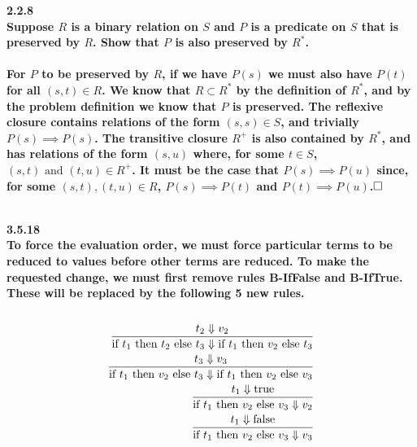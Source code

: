 \documentclass[12pt,letterpaper]{article}
\newcommand{\hwSect}[1] {\noindent\large\bf#1\rm\normalsize}
\newcommand{\done}{$\hfill\square$}
\begin{document}
\hwSect{2.2.8}\\
Suppose $R$ is a binary relation on $S$ and $P$ is a predicate on $S$ that is preserved by $R$. Show that $P$ is also preserved by $R^*$.\\ \\
For $P$ to be preserved by $R$, if we have $P(s)$ we must also have $P(t)$ for all $(s,t) \in R$.  We know that $R \subset R^*$ by the definition of $R^*$, and by the problem definition we know that $P$ is preserved.   The reflexive closure contains relations of the form $(s,s) \in S$, and trivially $P(s) \implies P(s)$. The transitive closure $R^+$ is also contained by $R^*$, and has relations of the form $(s,u)$ where, for some $t \in S$, $(s,t) \text{ and } (t,u) \in R^+$. It must be the case that $P(s) \implies P(u)$ since, for some $(s,t),(t,u) \in R$, $P(s) \implies P(t)$ and $P(t) \implies P(u)$.\done\\ \\

\begin{comment}
There are 3 types of elements in our new set: R, R ref, and R trans.  If the pair is from R then it obsviously still preserves P.  If the element is from R ref then the preservation of P is trivial because If s R t such that P(s) and P(t).

For R trans, we can look at all left terms in the relation as set S and all right terms in the relation as set T.  By applying R trans iterally we are adding new mappings from S to T.  However, we are not adding new elements to S or T; we have already evaluated the predicates of both sets in R and confirmed that R preserved P.  
\end{comment}

\hwSect{3.5.18}\\
To force the evaluation order, we must force particular terms to be reduced to values before other terms are reduced. To make the requested change, we must first remove rules B-IfFalse and B-IfTrue. These will be replaced by the following 5 new rules.\\ \\

\begin{eqnarray}
{t_2 \Downarrow v_2}\over{\text{if $t_1$ then $t_2$ else $t_3$} \Downarrow \text{if $t_1$ then $v_2$ else $t_3$}} \\
{t_3 \Downarrow v_3}\over{\text{if $t_1$ then $v_2$ else $t_3$} \Downarrow \text{if $t_1$ then $v_2$ else $v_3$}} \\
{t_1 \Downarrow \text{true}}\over{\text{if $t_1$ then $v_2$ else $v_3$} \Downarrow v_2} \\
{t_1 \Downarrow \text{false}}\over{\text{if $t_1$ then $v_2$ else $v_3$} \Downarrow v_3}
\end{eqnarray}
\end{document}
